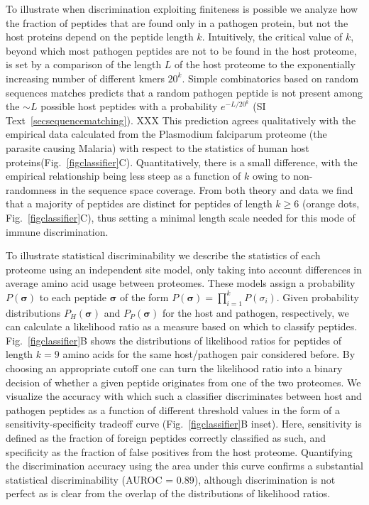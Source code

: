 \documentclass[superscriptaddress,twocolumn,pre]{revtex4}
\newcommand{\B}{\boldsymbol}
\newcommand{\<}{\langle}
\renewcommand{\>}{\rangle}
\begin{document}
To illustrate when discrimination exploiting finiteness is possible we analyze how the fraction of peptides that are found only in a pathogen protein, but not the host proteins depend on the peptide length $k$. Intuitively, the critical value of $k$, beyond which most pathogen peptides are not to be found in the host proteome, is set by a comparison of the length $L$ of the host proteome to the exponentially increasing number of different kmers $20^k$. Simple combinatorics based on random sequences matches predicts that a random pathogen peptide is not present among the $\sim L$ possible host peptides with a probability $e^{-L/20^k}$ (SI Text~\ref{secsequencematching}). XXX This prediction agrees qualitatively with the empirical data calculated from the Plasmodium falciparum proteome (the parasite causing Malaria) with respect to the statistics of human host proteins(Fig.~\ref{figclassifier}C). Quantitatively, there is a small difference, with the empirical relationship being less steep as a function of $k$ owing to non-randomness in the sequence space coverage. From both theory and data we find that a majority of peptides are distinct for peptides of length $k\geq6$ (orange dots, Fig.~\ref{figclassifier}C), thus setting a minimal length scale needed for this mode of immune discrimination.  

To illustrate statistical discriminability we describe the statistics of each proteome using an independent site model, only taking into account differences in average amino acid usage between proteomes. These models assign a probability $P(\B \sigma)$ to each peptide $\B \sigma$ of the form $P(\B \sigma) = \prod_{i=1}^k P(\sigma_i)$. Given probability distributions $P_H(\B \sigma)$ and $P_P(\B \sigma)$ for the host and pathogen, respectively, we can calculate a likelihood ratio as a measure based on which to classify peptides. Fig.~\ref{figclassifier}B shows the distributions of likelihood ratios for peptides of length $k=9$ amino acids for the same host/pathogen pair considered before. By choosing an appropriate cutoff one can turn the likelihood ratio into a binary decision of whether a given peptide originates from one of the two proteomes. We visualize the accuracy with which such a classifier discriminates between host and pathogen peptides as a function of different threshold values in the form of a sensitivity-specificity tradeoff curve (Fig.~\ref{figclassifier}B inset). Here, sensitivity is defined as the fraction of foreign peptides correctly classified as such, and specificity as the fraction of false positives from the host proteome. Quantifying the discrimination accuracy using the area under this curve confirms a substantial statistical discriminability (AUROC = 0.89), although discrimination is not perfect as is clear from the overlap of the distributions of likelihood ratios.
\end{document}
